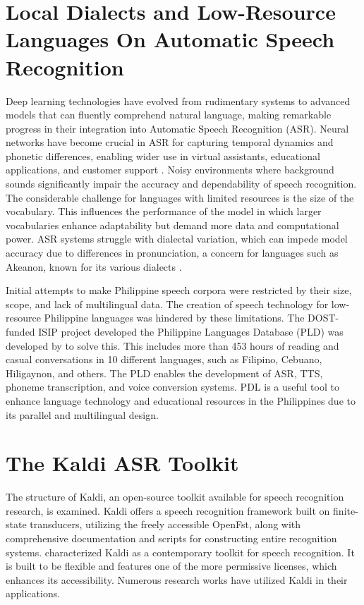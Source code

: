 \section{Local Dialects and Low-Resource Languages On Automatic Speech Recognition}
\label{sec:LocalDialects}
Deep learning technologies have evolved from rudimentary systems to advanced models that can fluently comprehend natural language, making remarkable progress in their integration into Automatic Speech Recognition (ASR). Neural networks have become crucial in ASR for capturing temporal dynamics and phonetic differences, enabling wider use in virtual assistants, educational applications, and customer support . Noisy environments where background sounds significantly impair the accuracy and dependability of speech recognition. The considerable challenge for languages with limited resources is the size of the vocabulary. This influences the performance of the model in which larger vocabularies enhance adaptability but demand more data and computational power. ASR systems struggle with dialectal variation, which can impede model accuracy due to differences in pronunciation, a concern for languages such as Akeanon, known for its various dialects . 

Initial attempts to make Philippine speech corpora were restricted by their size, scope, and lack of multilingual data. The creation of speech technology for low-resource Philippine languages was hindered by these limitations. The DOST-funded ISIP project developed the Philippine Languages Database (PLD) was developed by  to solve this. This includes more than 453 hours of reading and casual conversations in 10 different languages, such as Filipino, Cebuano, Hiligaynon, and others. The PLD enables the development of ASR, TTS, phoneme transcription, and voice conversion systems. PDL is a useful tool to enhance language technology and educational resources in the Philippines due to its parallel and multilingual design.

\section{The Kaldi ASR Toolkit}
\label{sec: KALDI}
The structure of Kaldi, an open-source toolkit available for speech recognition research, is examined. Kaldi offers a speech recognition framework built on finite-state transducers, utilizing the freely accessible OpenFst, along with comprehensive documentation and scripts for constructing entire recognition systems.
 characterized Kaldi as a contemporary toolkit for speech recognition. It is built to be flexible and features one of the more permissive licenses, which enhances its accessibility. Numerous research works have utilized Kaldi in their applications.

